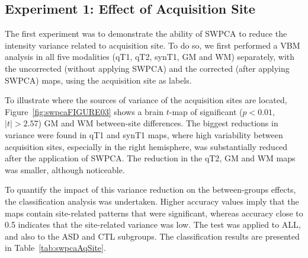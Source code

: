 \subsection{Experiment 1: Effect of Acquisition Site}\label{sec:swpcaE1}
The first experiment was to demonstrate the ability of SWPCA to reduce
the intensity variance related to acquisition site. To do so, we first
performed a \ac{VBM} analysis in all five modalities (\ac{qT1}, \ac{qT2}, \ac{synT1}, \ac{GM} and \ac{WM}) separately, with the uncorrected (without applying SWPCA) and
the corrected (after applying SWPCA) maps, using the acquisition site
as labels. 

To illustrate where the sources of variance of the acquisition sites are
located, Figure~\ref{fig:swpcaFIGURE03} shows a brain $t$-map of significant
($p<0.01$, $|t|>2.57$) \ac{GM} and \ac{WM}
between-site differences. The biggest reductions in variance were found
in \ac{qT1} and \ac{synT1} maps, where high variability between acquisition
sites, especially in the right hemisphere, was substantially reduced
after the application of SWPCA. The reduction in the \ac{qT2}, \ac{GM} and \ac{WM}
maps was smaller, although noticeable. 

To quantify the impact of this variance reduction on the between-groups
effects, the classification analysis was undertaken. Higher accuracy
values imply that the maps contain site-related patterns that were
significant, whereas accuracy close to 0.5 indicates that the
site-related variance was low. The test was applied to ALL, and also to
the ASD and CTL subgroups. The classification results are presented in
Table~\ref{tab:swpcaAqSite}. 
	
